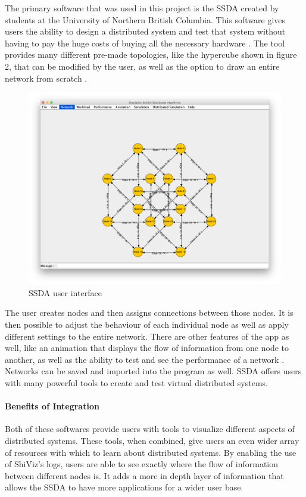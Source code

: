 \documentclass[12pt, oneside]{article}   	%
\begin{document}
The primary software that was used in this project is the SSDA created by students at the University of Northern British Columbia.  This software gives users the ability to design a distributed system and test that system without having to pay the huge costs of buying all the necessary hardware \cite{SSDA}.  The tool provides many different pre-made topologies, like the hypercube shown in figure 2, that can be modified by the user, as well as the option to draw an entire network from scratch \cite{SSDA}.  
\begin{figure}[t!!]
\caption{SSDA user interface \cite{SSDA}}
\includegraphics[scale=0.3]{SSDA_Example.png} 
\centering
\end{figure}The user creates nodes and then assigns connections between those nodes.  It is then possible to adjust the behaviour of each individual node as well as apply different settings to the entire network. There are other features of the app as well, like an animation that displays the flow of information from one node to another, as well as the ability to test and see the performance of a network \cite{SSDA}.  Networks can be saved and imported into the program as well.  SSDA offers users with many powerful tools to create and test virtual distributed systems.

\paragraph{Benefits of Integration}

Both of these softwares provide users with tools to visualize different aspects of distributed systems.  These tools, when combined, give users an even wider array of resources with which to learn about distributed systems.  By enabling the use of ShiViz's logs, users are able to see exactly where the flow of information between different nodes is.  It adds a more in depth layer of information that allows the SSDA to have more applications for a wider user base.
\end{document}
